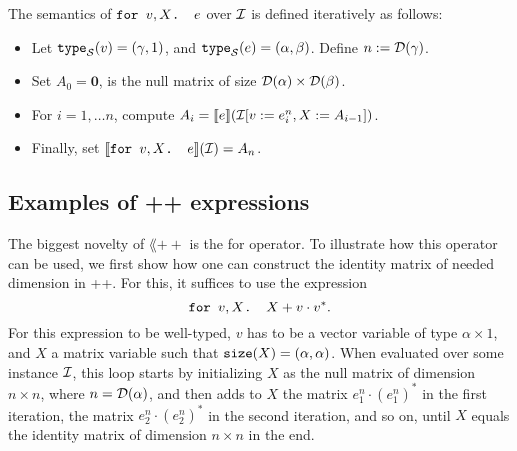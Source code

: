 The semantics of $\texttt{for }v,X \texttt{. }e$ over $\mathcal{I}$ is defined iteratively as follows:
\begin{itemize}
\item Let $\texttt{type}_{\mathcal{S}}(v)= (\gamma,1)$, and $\texttt{type}_{\mathcal{S}}(e) = (\alpha,\beta)$. Define $n := \mathcal{D}(\gamma)$.
\item Set $A_0 = \mathbf{0}$, is the null matrix of size $\mathcal{D}(\alpha)\times \mathcal{D}(\beta)$.
\item For $i=1,\ldots n$, compute $A_i = \llbracket e \rrbracket(\mathcal{I}[v := e^{n}_i, X:= A_{i-1}])$.
\item Finally, set $\llbracket \texttt{for }v,X \texttt{. }e \rrbracket(\mathcal{I}) = A_{n}$.
\end{itemize}


\subsection{Examples of \lang++ expressions}




The biggest novelty of $\lang++$ is the for operator. To illustrate how this operator can be used, we first show how one can construct the identity matrix of needed dimension in \lang++. For this, it suffices to use the expression $$\texttt{for }v,X \texttt{. }X + v\cdot v^*.$$ For this expression to be well-typed, $v$ has to be a vector variable of type $\alpha\times 1$, and $X$ a matrix variable such that $\texttt{size}(X) = (\alpha,\alpha)$. When evaluated over some instance $\mathcal{I}$, this loop starts by initializing $X$ as the null matrix of dimension $n\times n$, where $n=\mathcal{D}(\alpha)$, and then adds to $X$ the matrix $e_1^n\cdot (e_1^n)^*$ in the first iteration, the matrix $e_2^n\cdot (e_2^n)^*$ in the second iteration, and so on, until $X$ equals the identity matrix of dimension $n\times n$ in the end.

